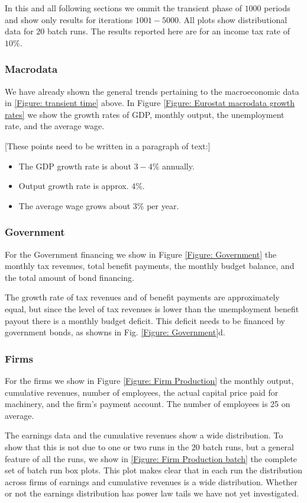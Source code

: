 In this and all following sections we ommit the transient phase of $1000$ periods and show only results for iterations $1001-5000$.
All plots show distributional data for $20$ batch runs. The results reported here are for an income tax rate of $10\%$.

\subsubsection*{Macrodata}
We have already shown the general trends pertaining to the macroeconomic data in \ref{Figure: transient time} above. 
In Figure \ref{Figure: Eurostat macrodata growth rates} we show the growth rates of GDP, monthly output, the unemployment rate, and the average wage.


[These points need to be written in a paragraph of text:]
\begin{itemize}
\item The GDP growth rate is about $3-4\%$ annually.
\item Output growth rate is approx. $4\%$.
\item The average wage grows about $3\%$ per year.
\end{itemize}

\subsubsection*{Government}
For the Government financing we show in Figure \ref{Figure: Government} the monthly tax revenues, total benefit payments, the monthly budget balance,
and the total amount of bond financing.

The growth rate of tax revenues and of benefit payments are approximately equal, but
since the level of tax revenues is lower than the unemployment benefit payout there is a monthly budget deficit.
This deficit needs to be financed by government bonds, as showns in Fig. \ref{Figure: Government}d.

\subsubsection*{Firms}
For the firms we show in Figure \ref{Figure: Firm Production} the monthly output, cumulative revenues, number of employees, the actual capital price paid for machinery, and the firm's payment account. The number of employees is 25 on average.

The earnings data and the cumulative revenues show a wide distribution. To show that this is not due to one or two runs in the $20$ batch runs, but a general feature of all the runs, we  show in \ref{Figure: Firm Production batch} the complete set of batch run box plots. This plot makes clear that in each run the distribution across firms of earnings and cumulative revenues is a wide distribution.
Whether or not the earnings distribution has power law tails we have not yet investigated.

